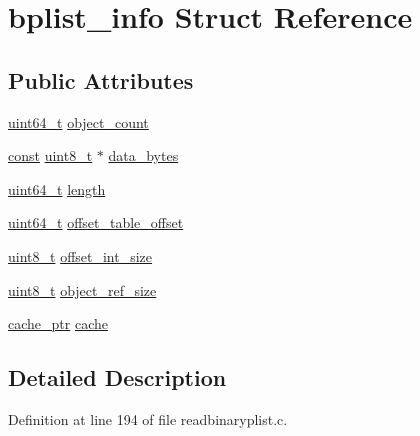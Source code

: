\hypertarget{structbplist__info}{}\section{bplist\+\_\+info Struct Reference}
\label{structbplist__info}
\subsection*{Public Attributes}
\begin{DoxyCompactItemize}
\item 
\hyperlink{lib-src_2ffmpeg_2win32_2stdint_8h_aec6fcb673ff035718c238c8c9d544c47}{uint64\+\_\+t} \hyperlink{structbplist__info_a2664eb47360dff6639f4085a50f321c9}{object\+\_\+count}
\item 
\hyperlink{getopt1_8c_a2c212835823e3c54a8ab6d95c652660e}{const} \hyperlink{lib-src_2ffmpeg_2win32_2stdint_8h_a9a941819355e6f658991890ff66b4b0e}{uint8\+\_\+t} $\ast$ \hyperlink{structbplist__info_ab0c039cf2d64b066815b31f648f3e165}{data\+\_\+bytes}
\item 
\hyperlink{lib-src_2ffmpeg_2win32_2stdint_8h_aec6fcb673ff035718c238c8c9d544c47}{uint64\+\_\+t} \hyperlink{structbplist__info_ae15894e235d748166b0c928e0a36670f}{length}
\item 
\hyperlink{lib-src_2ffmpeg_2win32_2stdint_8h_aec6fcb673ff035718c238c8c9d544c47}{uint64\+\_\+t} \hyperlink{structbplist__info_ab999b6c7a605a4b0f9ba31d8ff10dc7f}{offset\+\_\+table\+\_\+offset}
\item 
\hyperlink{lib-src_2ffmpeg_2win32_2stdint_8h_a9a941819355e6f658991890ff66b4b0e}{uint8\+\_\+t} \hyperlink{structbplist__info_ab8fd5fa265f809e0ed0f245a1ae71ad6}{offset\+\_\+int\+\_\+size}
\item 
\hyperlink{lib-src_2ffmpeg_2win32_2stdint_8h_a9a941819355e6f658991890ff66b4b0e}{uint8\+\_\+t} \hyperlink{structbplist__info_ab8d0fc75c50cbbb4ae8ac400482d14bd}{object\+\_\+ref\+\_\+size}
\item 
\hyperlink{readbinaryplist_8c_a118d960e0af4274adcfc634c34d24d2d}{cache\+\_\+ptr} \hyperlink{structbplist__info_a3ea7b1feecc7c5fa1f988e39f57c7c4a}{cache}
\end{DoxyCompactItemize}


\subsection{Detailed Description}


Definition at line 194 of file readbinaryplist.\+c.



